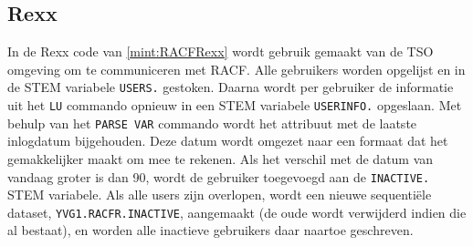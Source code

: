 \subsection{Rexx}
In de Rexx code van \ref{mint:RACFRexx} wordt gebruik gemaakt van de TSO omgeving om te communiceren met RACF. Alle gebruikers worden opgelijst en in de STEM variabele \texttt{USERS.} gestoken. Daarna wordt per gebruiker de informatie uit het \texttt{LU} commando opnieuw in een STEM variabele \texttt{USERINFO.} opgeslaan. Met behulp van het \texttt{PARSE VAR} commando wordt het attribuut met de laatste inlogdatum bijgehouden. Deze datum wordt omgezet naar een formaat dat het gemakkelijker maakt om mee te rekenen. Als het verschil met de datum van vandaag groter is dan 90, wordt de gebruiker toegevoegd aan de \texttt{INACTIVE.} STEM variabele. Als alle users zijn overlopen, wordt een nieuwe sequentiële dataset, \texttt{YVG1.RACFR.INACTIVE}, aangemaakt (de oude wordt verwijderd indien die al bestaat), en worden alle inactieve gebruikers daar naartoe geschreven.

